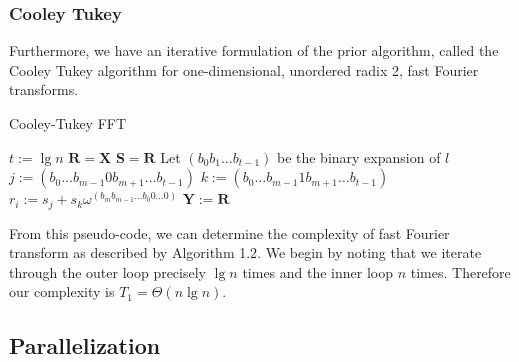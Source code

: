 \documentclass[notitlepage, twocolumn]{article}
\begin{document}
\subsubsection{Cooley Tukey}

Furthermore, we have an iterative formulation of the prior algorithm, called the Cooley Tukey algorithm for one-dimensional, unordered radix 2, fast Fourier transforms.

\begin{algorithm}
	\caption{Cooley-Tukey FFT}
	\begin{algorithmic}[1]
			\State $t:=\lg n$
			\State $\mathbf{R}=\mathbf{X}$
				\State $\mathbf{S}=\mathbf{R}$
					\State Let $(b_0b_1\ldots b_{t-1})$ be the binary expansion of $l$
					\State $j:=(b_0\ldots b_{m-1}0b_{m+1}\ldots b_{t-1})$
					\State $k:=(b_0\ldots b_{m-1}1b_{m+1}\ldots b_{t-1})$
					\State $r_i:= s_j+s_k\omega^{(b_mb_{m-1}\ldots b_0 0\ldots0)}$
				\EndFor
			\EndFor
			\State $\mathbf{Y}:=\mathbf{R}$
		\EndFunction
	\end{algorithmic}
\end{algorithm}

From this pseudo-code, we can determine the complexity of fast Fourier transform as described by Algorithm 1.2.
We begin by noting that we iterate through the outer loop precisely $\lg n$ times and the inner loop $n$ times.
Therefore our complexity is $T_1=\Theta(n\lg n)$.

\subsection{Parallelization}
\end{document}
